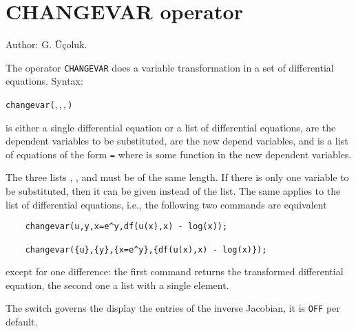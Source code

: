 \section{CHANGEVAR operator}
\hypertarget{operator:CHANGEVAR}{}

\noindent
Author: G. \"{U}\c{c}oluk.

The operator \texttt{CHANGEVAR} does a variable transformation in a set of
differential equations.
Syntax:
\begin{syntaxtable}
  \texttt{changevar(},\,,\,,\,\texttt{)}
\end{syntaxtable}
 is either a single differential equation or a list of
differential equations,  are the dependent variables to
be substituted,  are the new depend variables, and
 is a list of equations of the form 
\texttt{=}  where  is some function
in the new dependent variables.

The three lists , , and  must
be of the same length. If there is only one variable to be
substituted, then it can be given instead of the list. The same applies to the list
of differential equations, i.e., the following two
commands are equivalent
\begin{verbatim}
    changevar(u,y,x=e^y,df(u(x),x) - log(x));

    changevar({u},{y},{x=e^y},{df(u(x),x) - log(x)});
\end{verbatim}
except for one difference: the first command returns the transformed differential
equation, the second one a list with a single element.

\hypertarget{switch:DISPJACOBIAN}{}
The switch  governs the display the entries of the inverse Jacobian,
it is \texttt{OFF} per default.

